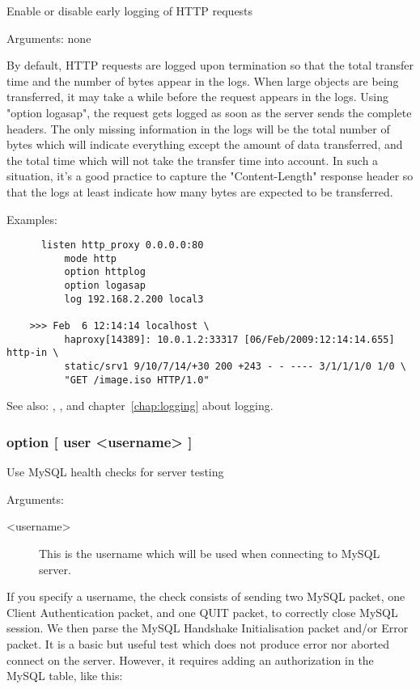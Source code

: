 {

  Enable or disable early logging of HTTP requests


  Arguments: none

  By default, HTTP requests are logged upon termination so that the total
  transfer time and the number of bytes appear in the logs. When large objects
  are being transferred, it may take a while before the request appears in the
  logs. Using "option logasap", the request gets logged as soon as the server
  sends the complete headers. The only missing information in the logs will be
  the total number of bytes which will indicate everything except the amount
  of data transferred, and the total time which will not take the transfer
  time into account. In such a situation, it's a good practice to capture the
  "Content-Length" response header so that the logs at least indicate how many
  bytes are expected to be transferred.

  Examples:
\begin{verbatim}
      listen http_proxy 0.0.0.0:80
          mode http
          option httplog
          option logasap
          log 192.168.2.200 local3

    >>> Feb  6 12:14:14 localhost \
          haproxy[14389]: 10.0.1.2:33317 [06/Feb/2009:12:14:14.655] http-in \
          static/srv1 9/10/7/14/+30 200 +243 - - ---- 3/1/1/1/0 1/0 \
          "GET /image.iso HTTP/1.0"
\end{verbatim}

  See also: , , and chapter~\ref{chap:logging} about
             logging.

\subsubsection[mysql-check]{option \kw{mysql-check} [ user <username> ]}
\index{mysql-check}

  Use MySQL health checks for server testing


  Arguments:
\begin{description}
\item[<username>] This is the username which will be used when connecting to MySQL
               server.
\end{description}

  If you specify a username, the check consists of sending two MySQL packet,
  one Client Authentication packet, and one QUIT packet, to correctly close
  MySQL session. We then parse the MySQL Handshake Initialisation packet and/or
  Error packet. It is a basic but useful test which does not produce error nor
  aborted connect on the server. However, it requires adding an authorization
  in the MySQL table, like this:

}
